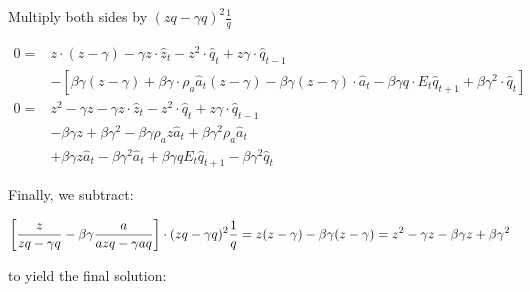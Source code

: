 \documentclass[11pt,preprint, authoryear]{elsarticle}
\numberwithin{equation}{section}
\numberwithin{figure}{section}
\numberwithin{table}{section}
\begin{document}
Multiply both sides by \((z q-\gamma q)^{2} \frac{1}{q}\)

\[\begin{aligned}
0 = & z \cdot (z -\gamma )
- \gamma z \cdot \hat{z}_t 
- z^{2} \cdot \hat{q}_t 
+ z \gamma \cdot \hat{q}_{t-1}\\
&-\left[
\beta \gamma(z -\gamma )
+ \beta \gamma \cdot \rho_a\hat{a}_t (z -\gamma )
- \beta \gamma (z -\gamma ) \cdot \hat{a}_{t}
- \beta \gamma q \cdot E_t\hat{q}_{t+1}
+ \beta \gamma^2 \cdot \hat{q}_{t} \right]\\
0 = & z^{2}-\gamma z
- \gamma z \cdot \hat{z}_t 
- z^{2} \cdot \hat{q}_t 
+ z \gamma \cdot \hat{q}_{t-1}\\
&-\beta \gamma z+\beta \gamma^{2}-\beta \gamma \rho_{a} z \hat{a}_{t}+\beta \gamma^{2} \rho_{a} \hat{a}_{t}\\
&+\beta \gamma z \hat{a}_{t}-\beta \gamma^{2} \hat{a}_{t}
+\beta \gamma q E_{t} \hat{q}_{t+1}-\beta \gamma^{2} \hat{q}_{t}
\end{aligned}\]

Finally, we subtract:

\[\left[\frac{z}{z q-\gamma q}-\beta \gamma \frac{a}{a z q-\gamma a q} \right] \cdot (z q-\gamma q)^{2} \frac{1}{q}\\
= z(z -\gamma) -\beta \gamma (z- \gamma)\\
=z^2 -\gamma z-\beta \gamma z + \beta \gamma^2\]

to yield the final solution:
\end{document}
